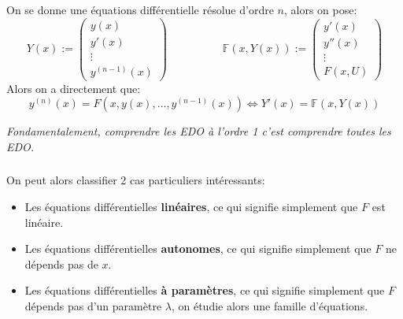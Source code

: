 \subsection*{}
On se donne une équations différentielle résolue d'ordre \(n\), alors on pose:
\[
   Y(x) := \begin{pmatrix}
      y(x)\\
      y'(x)\\
      \vdots\\
      y^{(n-1)}(x)
   \end{pmatrix} \quad \quad \quad \quad\quad
   \mathbb{F}(x, Y(x)) := \begin{pmatrix}
      y'(x)\\
      y''(x)\\
      \vdots\\
      F(x, U)
   \end{pmatrix}
\]
Alors on a directement que:
\[
   y^{(n)}(x) = F(x, y(x), \ldots, y^{(n-1)}(x)) \Longleftrightarrow Y'(x) = \mathbb{F}(x, Y(x))
\]
\begin{center}
   \textit{Fondamentalement, comprendre les EDO à l'ordre 1 c'est comprendre toutes les EDO.}
\end{center}

\subsection*{}
On peut alors classifier 2 cas particuliers intéressants:
\begin{itemize}
   \item Les équations différentielles \textbf{linéaires}, ce qui signifie simplement que \(F\) est linéaire.
   \item Les équations différentielles \textbf{autonomes}, ce qui signifie simplement que \(F\) ne dépends pas de \(x\).
   \item Les équations différentielles \textbf{à paramètres}, ce qui signifie simplement que \(F\) dépends pas d'un paramètre \(\lambda\), on étudie alors une famille d'équations.
\end{itemize}

\chapter*{}

\chapter*{}

\chapter*{}

\chapter*{}
